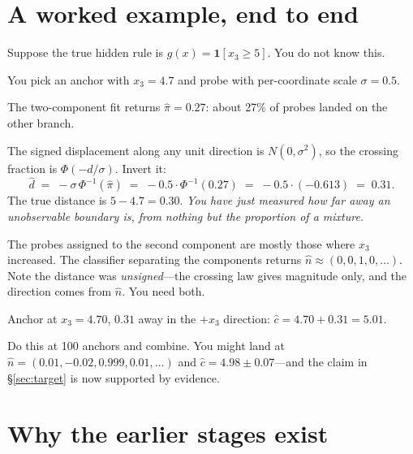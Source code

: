 \documentclass[11pt]{article}
\newcommand{\Ind}{\mathbf{1}}
\newcommand{\dhat}{\hat{d}}
\newcommand{\pihat}{\hat{\pi}}
\newcommand{\nhat}{\hat{n}}
\newcommand{\chat}{\hat{c}}
\begin{document}
\section{A worked example, end to end}
\label{sec:example}

Suppose the true hidden rule is $g(x) = \Ind[x_3 \ge 5]$. You do not know this.

You pick an anchor with $x_3 = 4.7$ and probe with per-coordinate scale $\sigma = 0.5$.

\begin{description}[leftmargin=0pt,style=unboxed,itemsep=5pt]
\item[\textnormal{\textbf{1. The mixture.}}] The two-component fit returns $\pihat = 0.27$: about
27\% of probes landed on the other branch.

\item[\textnormal{\textbf{2. Distance.}}] The signed displacement along any unit direction is
$N(0,\sigma^2)$, so the crossing fraction is $\Phi(-d/\sigma)$. Invert it:
\[
  \dhat \;=\; -\sigma\,\Phi^{-1}(\pihat) \;=\; -0.5 \cdot \Phi^{-1}(0.27)
        \;=\; -0.5 \cdot (-0.613) \;=\; 0.31 .
\]
The true distance is $5 - 4.7 = 0.30$. \emph{You have just measured how far away an unobservable
boundary is, from nothing but the proportion of a mixture.}

\item[\textnormal{\textbf{3. Direction.}}] The probes assigned to the second component are mostly
those where $x_3$ increased. The classifier separating the components returns
$\nhat \approx (0,0,1,0,\dots)$. Note the distance was \emph{unsigned}---the crossing law gives
magnitude only, and the direction comes from $\nhat$. You need both.

\item[\textnormal{\textbf{4. Offset.}}] Anchor at $x_3 = 4.70$, $0.31$ away in the $+x_3$
direction: $\chat = 4.70 + 0.31 = 5.01$.

\item[\textnormal{\textbf{5. Pool.}}] Do this at 100 anchors and combine. You might land at
$\nhat = (0.01,-0.02,0.999,0.01,\dots)$ and $\chat = 4.98 \pm 0.07$---and the claim in
\S\ref{sec:target} is now supported by evidence.
\end{description}

\section{Why the earlier stages exist}
\label{sec:why}
\end{document}
